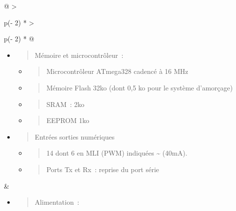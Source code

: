\documentclass[
]{article}
\begin{document}
\begin{longtable}[]{@{}
  >{\raggedright\arraybackslash}p{(\columnwidth - 2\tabcolsep) * }
  >{\raggedright\arraybackslash}p{(\columnwidth - 2\tabcolsep) * }@{}}
\toprule
\endhead
\begin{minipage}[t]{\linewidth}\raggedright
\begin{itemize}
\item
  \begin{quote}
  Mémoire et microcontrôleur~:
  \end{quote}

  \begin{itemize}
  \item
    \begin{quote}
    Microcontrôleur ATmega328 cadencé à 16 MHz
    \end{quote}
  \item
    \begin{quote}
    Mémoire Flash 32ko (dont 0,5 ko pour le système d'amorçage)
    \end{quote}
  \item
    \begin{quote}
    SRAM~: 2ko
    \end{quote}
  \item
    \begin{quote}
    EEPROM 1ko
    \end{quote}
  \end{itemize}
\item
  \begin{quote}
  Entrées sorties numériques
  \end{quote}

  \begin{itemize}
  \item
    \begin{quote}
    14 dont 6 en MLI (PWM) indiquées \textasciitilde{} (40mA).
    \end{quote}
  \item
    \begin{quote}
    Ports Tx et Rx~: reprise du port série
    \end{quote}
  \end{itemize}
\end{itemize}
\end{minipage} & \begin{minipage}[t]{\linewidth}\raggedright
\begin{itemize}
\item
  \begin{quote}
  Alimentation~:
  \end{quote}


\end{itemize}
\end{minipage}
\end{longtable}
\end{document}
